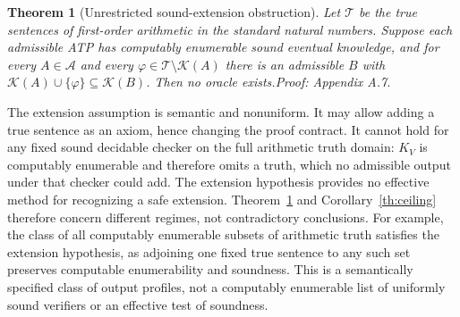 \documentclass[11pt]{article}
\newtheorem{theorem}{Theorem}[section]
\newcommand{\T}{\mathcal T}\newcommand{\K}{\mathcal K}\newcommand{\I}{\mathcal I}\newcommand{\A}{\mathcal A}
\newcommand{\pf}[1]{\unskip\hspace{.6em plus 1fill}\textit{Proof: Appendix A.#1.}}
\begin{document}
\begin{theorem}[Unrestricted sound-extension obstruction]\label{th:arith}
Let $\T$ be the true sentences of first-order arithmetic in the standard natural numbers. Suppose each admissible ATP has computably enumerable sound eventual knowledge, and for every $A\in\A$ and every $\varphi\in\T\setminus\K(A)$ there is an admissible $B$ with $\K(A)\cup\{\varphi\}\subseteq\K(B)$. Then no oracle exists.\pf{7}
\end{theorem}
The extension assumption is semantic and nonuniform. It may allow adding a true sentence as an axiom, hence changing the proof contract. It cannot hold for any fixed sound decidable checker on the full arithmetic truth domain: $K_V$ is computably enumerable and therefore omits a truth, which no admissible output under that checker could add. The extension hypothesis provides no effective method for recognizing a safe extension. Theorem~\ref{th:arith} and Corollary~\ref{th:ceiling} therefore concern different regimes, not contradictory conclusions. For example, the class of all computably enumerable subsets of arithmetic truth satisfies the extension hypothesis, as adjoining one fixed true sentence to any such set preserves computable enumerability and soundness. This is a semantically specified class of output profiles, not a computably enumerable list of uniformly sound verifiers or an effective test of soundness.
\end{document}
